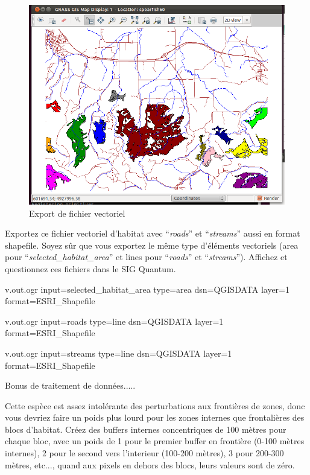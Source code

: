 \begin{figure}[htbp]
   \centering
   \includegraphics[scale=0.35]{grass024.png}
   \caption{Export de fichier vectoriel}
   \label{fig:grass024}
\end{figure}

Exportez ce fichier vectoriel d'habitat avec ``\textit{roads}'' et ``\textit{streams}'' aussi en format shapefile. Soyez s\^ur que vous exportez le m\^eme type d'\'el\'ements vectoriels (area pour ``\textit{selected\_habitat\_area}'' et lines pour ``\textit{roads}'' et ``\textit{streams}''). Affichez et questionnez ces fichiers dans le SIG Quantum.

\begin{smallverbatim}
v.out.ogr input=selected_habitat_area type=area
 dsn=QGISDATA layer=1 format=ESRI_Shapefile

v.out.ogr input=roads type=line dsn=QGISDATA
 layer=1 format=ESRI_Shapefile

v.out.ogr input=streams type=line dsn=QGISDATA
 layer=1 format=ESRI_Shapefile
\end{smallverbatim}

Bonus de traitement de donn\'ees.....

Cette esp\`ece est assez intol\'erante des perturbations aux fronti\`eres de zones, donc vous devriez faire un poids plus lourd pour les zones internes que frontali\`eres des blocs d'habitat. Cr\'eez des buffers internes concentriques de 100 m\`etres pour chaque bloc, avec un poids de 1 pour le premier buffer en fronti\`ere (0-100 m\`etres internes), 2 pour le second vers l'interieur (100-200 m\`etres), 3 pour 200-300 m\`etres, etc..., quand aux pixels en dehors des blocs, leurs valeurs sont de z\'ero.


